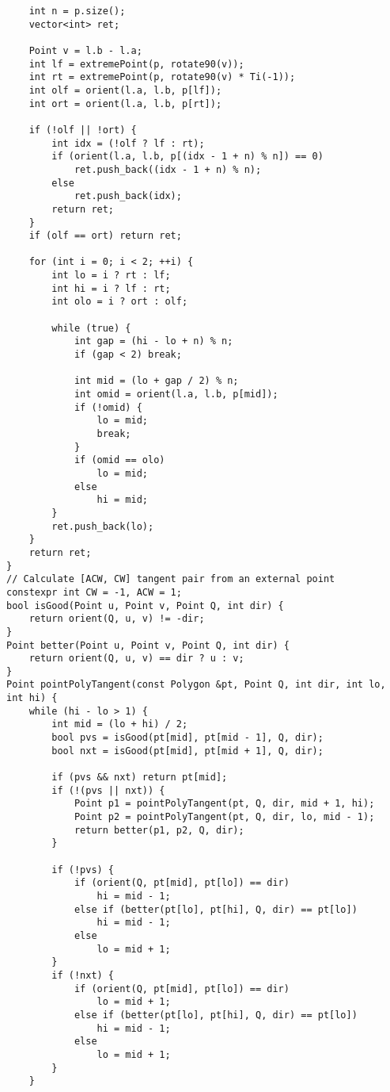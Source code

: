 \documentclass[FSZ,a4paper,onesided]{article}
\begin{document}
\begin{multicols*}{\COLS}
\begin{lstlisting}
    int n = p.size();
    vector<int> ret;

    Point v = l.b - l.a;
    int lf = extremePoint(p, rotate90(v));
    int rt = extremePoint(p, rotate90(v) * Ti(-1));
    int olf = orient(l.a, l.b, p[lf]);
    int ort = orient(l.a, l.b, p[rt]);

    if (!olf || !ort) {
        int idx = (!olf ? lf : rt);
        if (orient(l.a, l.b, p[(idx - 1 + n) % n]) == 0)
            ret.push_back((idx - 1 + n) % n);
        else
            ret.push_back(idx);
        return ret;
    }
    if (olf == ort) return ret;

    for (int i = 0; i < 2; ++i) {
        int lo = i ? rt : lf;
        int hi = i ? lf : rt;
        int olo = i ? ort : olf;

        while (true) {
            int gap = (hi - lo + n) % n;
            if (gap < 2) break;

            int mid = (lo + gap / 2) % n;
            int omid = orient(l.a, l.b, p[mid]);
            if (!omid) {
                lo = mid;
                break;
            }
            if (omid == olo)
                lo = mid;
            else
                hi = mid;
        }
        ret.push_back(lo);
    }
    return ret;
}
// Calculate [ACW, CW] tangent pair from an external point
constexpr int CW = -1, ACW = 1;
bool isGood(Point u, Point v, Point Q, int dir) {
    return orient(Q, u, v) != -dir;
}
Point better(Point u, Point v, Point Q, int dir) {
    return orient(Q, u, v) == dir ? u : v;
}
Point pointPolyTangent(const Polygon &pt, Point Q, int dir, int lo, int hi) {
    while (hi - lo > 1) {
        int mid = (lo + hi) / 2;
        bool pvs = isGood(pt[mid], pt[mid - 1], Q, dir);
        bool nxt = isGood(pt[mid], pt[mid + 1], Q, dir);

        if (pvs && nxt) return pt[mid];
        if (!(pvs || nxt)) {
            Point p1 = pointPolyTangent(pt, Q, dir, mid + 1, hi);
            Point p2 = pointPolyTangent(pt, Q, dir, lo, mid - 1);
            return better(p1, p2, Q, dir);
        }

        if (!pvs) {
            if (orient(Q, pt[mid], pt[lo]) == dir)
                hi = mid - 1;
            else if (better(pt[lo], pt[hi], Q, dir) == pt[lo])
                hi = mid - 1;
            else
                lo = mid + 1;
        }
        if (!nxt) {
            if (orient(Q, pt[mid], pt[lo]) == dir)
                lo = mid + 1;
            else if (better(pt[lo], pt[hi], Q, dir) == pt[lo])
                hi = mid - 1;
            else
                lo = mid + 1;
        }
    }


\end{lstlisting}
\end{multicols*}
\end{document}
